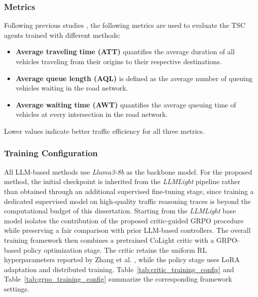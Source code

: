 \subsubsection{Metrics}
Following previous studies \cite{pmlr-v162-zhang22ah}, the following metrics are used to evaluate the TSC agents trained with different methods:
\begin{itemize}
    \item \textbf{Average traveling time (ATT)} quantifies the average duration of all vehicles traveling from their origins to their respective destinations.
    \item \textbf{Average queue length (AQL)} is defined as the average number of queuing vehicles waiting in the road network.
    \item \textbf{Average waiting time (AWT)} quantifies the average queuing time of vehicles at every intersection in the road network.
\end{itemize}
Lower values indicate better traffic efficiency for all three metrics.

\subsubsection{Training Configuration}
All LLM-based methods use \textit{Llama3-8b} as the backbone model. For the proposed method, the initial checkpoint is inherited from the \textit{LLMLight} pipeline \cite{lai2024llmlightlargelanguagemodels} rather than obtained through an additional supervised fine-tuning stage, since training a dedicated supervised model on high-quality traffic reasoning traces is beyond the computational budget of this dissertation. Starting from the \textit{LLMLight} base model isolates the contribution of the proposed critic-guided GRPO procedure while preserving a fair comparison with prior LLM-based controllers. The overall training framework then combines a pretrained CoLight critic with a GRPO-based policy optimization stage. The critic retains the uniform RL hyperparameters reported by Zhang et al. \cite{pmlr-v162-zhang22ah}, while the policy stage uses LoRA adaptation and distributed training. Table~\ref{tab:critic_training_config} and Table~\ref{tab:grpo_training_config} summarize the corresponding framework settings.

